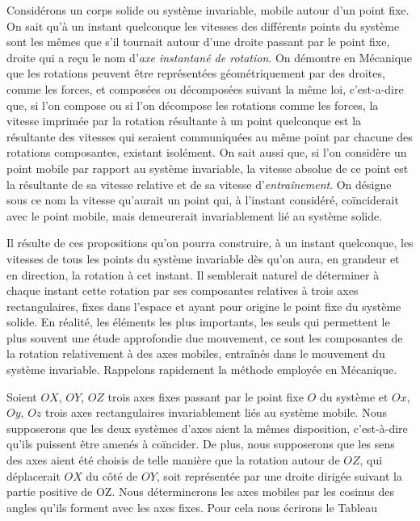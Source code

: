 
\label{chp1}

 Considérons un corps solide ou système invariable, mobile autour d'un point fixe. On sait qu'à un instant 
quelconque les vitesses des différents points du système sont les mêmes que s'il tournait autour d'une droite passant 
par le point fixe, droite qui a reçu le nom d'\textit{axe instantané de rotation}. On démontre en Mécanique que les 
rotations peuvent être représentées géométriquement par des droites, comme les forces, et composées ou décomposées 
suivant la même loi, c'est-a-dire que, si l'on compose ou si l'on décompose les rotations comme les forces, la vitesse 
imprimée par la rotation résultante à un point quelconque est la résultante des vitesses qui seraient communiquées au 
même point par chacune des rotations composantes, existant isolément. On sait aussi que, si l'on considère un point 
mobile par rapport au système invariable, la vitesse absolue de ce point est la résultante de sa vitesse relative et 
de sa vitesse d'\textit{entraînement}. On désigne sous ce nom la vitesse qu'aurait un point qui, à l'instant considéré, 
coïnciderait avec le point mobile, mais demeurerait invariablement lié au système solide.

Il résulte de ces propositions qu'on pourra construire, à un instant quelconque, les vitesses de tous les points du 
système invariable dès qu'on aura, en grandeur et en direction, la rotation à cet instant. Il semblerait naturel de 
déterminer à chaque instant cette rotation par ses composantes relatives à trois axes rectangulaires, fixes dans 
l'espace et ayant pour origine le point fixe du système solide. En réalité, les éléments les plus importants, les seuls 
qui permettent le plus souvent une étude approfondie due mouvement, ce sont les composantes de la rotation relativement 
à des axes mobiles, entraînés dans le mouvement du système invariable. Rappelons rapidement la méthode employée en 
Mécanique.

Soient $OX$, $OY$, $OZ$ trois axes fixes passant par le point fixe $O$ du système et $Ox$, $Oy$, $Oz$ trois axes 
rectangulaires invariablement liés au système mobile. Nous supposerons que les deux systèmes d'axes aient la mêmes 
disposition, c'est-à-dire qu'ils puissent être amenés à coïncider. De plus, nous supposerons que les sens des axes 
aient été choisis de telle manière que la rotation autour de $OZ$, qui déplacerait $OX$ du côté de $OY$, soit 
représentée par une droite dirigée suivant la partie positive de OZ. Nous déterminerons les axes mobiles par les 
cosinus des angles qu'ils forment avec les axes fixes. Pour cela nous écrirons le Tableau 


